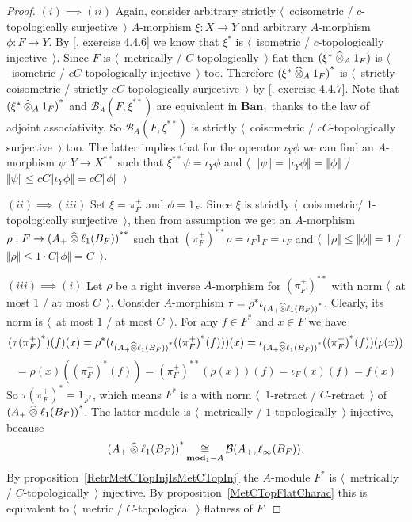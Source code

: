 \begin{proof} $(i)\implies (ii)$ Again, consider arbitrary strictly 
$\langle$~coisometric / $c$-topologically surjective~$\rangle$ $A$-morphism
$\xi:X\to Y$ and arbitrary $A$-morphism $\phi:F\to Y$. By
[\cite{HelLectAndExOnFuncAn}, exercise 4.4.6] we know that $\xi^*$ is
$\langle$~isometric / $c$-topologically injective~$\rangle$. Since $F$ is
$\langle$~metrically / $C$-topologically~$\rangle$ flat then
$(\xi^*\mathbin{\widehat{\otimes}}_{A}1_F)$ is $\langle$~isometric / $cC$-topologically
injective~$\rangle$ too. Therefore ${(\xi^*\mathbin{\widehat{\otimes}}_{A}1_F)}^*$ is
$\langle$~strictly coisometric / strictly $cC$-topologically
surjective~$\rangle$ by [\cite{HelLectAndExOnFuncAn}, exercise 4.4.7]. Note that
${(\xi^*\mathbin{\widehat{\otimes}}_{A}1_F)}^*$ and $\mathcal{B}_A(F,\xi^{**})$ are equivalent
in $\mathbf{Ban}_1$ thanks to the law of adjoint associativity. So
$\mathcal{B}_A(F,\xi^{**})$ is strictly $\langle$~coisometric / 
$cC$-topologically surjective~$\rangle$ too. The latter implies that for the
operator $\iota_Y\phi$ we can find an $A$-morphism $\psi:Y\to X^{**}$ such that
$\xi^{**}\psi=\iota_Y\phi$ and
$\langle$~$\Vert\psi\Vert=\Vert\iota_Y\phi\Vert=\Vert\phi\Vert$ /
$\Vert\psi\Vert\leq cC\Vert\iota_Y\phi\Vert=cC\Vert\phi\Vert$~$\rangle$

$(ii)\implies (iii)$ Set $\xi=\pi_F^+$ and $\phi=1_F$. Since $\xi$ is
strictly $\langle$~coisometric/ $1$-topologically surjective~$\rangle$,
then from assumption we get an $A$-morphism $\rho:F\to
{(A_+\mathbin{\widehat{\otimes}}\ell_1(B_F))}^{**}$ such that 
${(\pi_F^+)}^{**}\rho
=\iota_F 1_F
=\iota_F$ 
and $\langle$~$\Vert\rho\Vert\leq \Vert\phi\Vert=1$ /
$\Vert\rho\Vert\leq 1\cdot C\Vert\phi\Vert=C$~$\rangle$.

$(iii)\implies (i)$ Let $\rho$ be a right inverse $A$-morphism for
${(\pi_F^+)}^{**}$ with norm $\langle$~at most $1$ / at most $C$~$\rangle$.
Consider $A$-morphism $\tau=\rho^*\iota_{{(A_+\mathbin{\widehat{\otimes}}\ell_1(B_F))}^*}$.
Clearly, its norm is $\langle$~at most $1$ / at most $C$~$\rangle$. For any
$f\in F^*$ and $x\in F$ we have
$$
({\tau(\pi_F^+)}^*)(f)(x)
=\rho^*(\iota_{{(A_+\mathbin{\widehat{\otimes}}\ell_1(B_F))}^*}({(\pi_F^+)}^*(f)))(x)
=\iota_{{(A_+\mathbin{\widehat{\otimes}}\ell_1(B_F))}^*}({(\pi_F^+)}^*(f))(\rho(x))
$$
$$
=\rho(x)({(\pi_F^+)}^*(f))
={(\pi_F^+)}^{**}(\rho(x))(f)
=\iota_F(x)(f)
=f(x)
$$
So ${\tau(\pi_F^+)}^*=1_{F^*}$, which means $F^*$ is a with norm
$\langle$~$1$-retract / $C$-retract~$\rangle$ of
${(A_+\mathbin{\widehat{\otimes}}\ell_1(B_F))}^*$. The latter module is $\langle$~metrically /
$1$-topologically~$\rangle$ injective, because 
$$
{(A_+\mathbin{\widehat{\otimes}}\ell_1(B_F))}^*
\mathop{\mathbin{\cong}}\limits_{\mathbf{mod}_1-A}
\mathcal{B}(A_+,\ell_\infty(B_F)).
$$ 
By proposition~\ref{RetrMetCTopInjIsMetCTopInj} the $A$-module $F^*$ is
$\langle$~metrically / $C$-topologically~$\rangle$ injective. By 
proposition~\ref{MetCTopFlatCharac} this is
equivalent to $\langle$~metric / $C$-topological~$\rangle$ flatness of $F$.
\end{proof}

